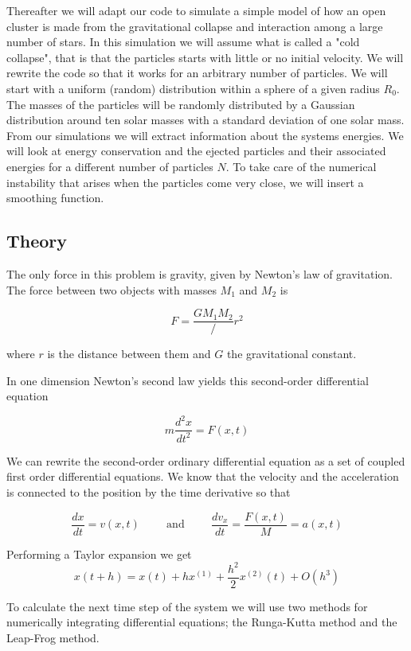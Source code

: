 \documentclass[a4paper,12pt, english]{article}
\begin{document}
Thereafter we will adapt our code to simulate a simple model of how an open cluster is made from the gravitational collapse and interaction among a large number of stars. In this simulation we will assume what is called a "cold collapse", that is that the particles starts with little or no initial velocity. We will rewrite the code so that it works for an arbitrary number of particles. We will start with a uniform (random) distribution within a sphere of a given radius $R_0$. The masses of the particles will be randomly distributed by a Gaussian distribution around ten solar masses with a standard deviation of one solar mass. From our simulations we will extract information about the systems energies. We will look at energy conservation and the ejected particles and their associated energies for a different number of particles $N$.
To take care of the numerical instability that arises when the particles come very close, we will insert a smoothing function.


\subsection*{Theory}

The only force in this problem is gravity, given by Newton's law of gravitation. The force between two objects with masses $M_1$ and $M_2$ is

\[
F = \frac{GM_1 M_2}/{r^2}
\]

where $r$ is the distance between them and $G$ the gravitational constant.

In one dimension Newton's second law yields this second-order differential equation

$$m\frac{d^2x}{dt^2} = F(x,t)$$

We can rewrite the second-order ordinary differential equation as a set of coupled first order differential equations.
We know that the velocity and the acceleration is connected to the position by the time derivative so that

\[
\frac{dx}{dt} = v(x,t) \hspace{1cm}\mathrm{and}\hspace{1cm}
\frac{dv_x}{dt} = \frac{F(x,t)}{M} = a(x,t)
\]

Performing a Taylor expansion we get
\[
x(t+h) = x(t) + hx^{(1)} + \frac{h^2}{2}x^{(2)}(t) + O(h^3)
\]

To calculate the next time step of the system we will use two methods for numerically integrating differential equations; the Runga-Kutta method and the Leap-Frog method.
\end{document}
